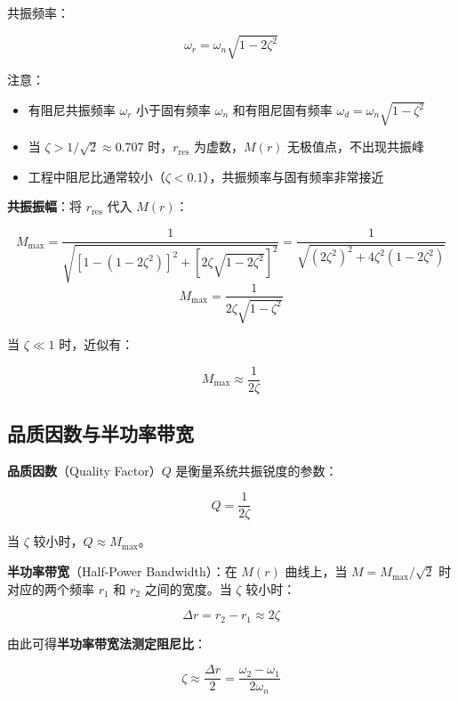 共振频率：
\begin{myformula}
    \[
    \omega_r = \omega_n\sqrt{1-2\zeta^2}
    \]
\end{myformula}

注意：
\begin{itemize}
    \item 有阻尼共振频率 $\omega_r$ 小于固有频率 $\omega_n$ 和有阻尼固有频率 $\omega_d = \omega_n\sqrt{1-\zeta^2}$
    \item 当 $\zeta > 1/\sqrt{2} \approx 0.707$ 时，$r_{\text{res}}$ 为虚数，$M(r)$ 无极值点，不出现共振峰
    \item 工程中阻尼比通常较小（$\zeta < 0.1$），共振频率与固有频率非常接近
\end{itemize}

\textbf{共振振幅}：将 $r_{\text{res}}$ 代入 $M(r)$：
\begin{myformula}
    \[
    M_{\max} = \frac{1}{\sqrt{[1 - (1-2\zeta^2)]^2 + [2\zeta\sqrt{1-2\zeta^2}]^2}}
             = \frac{1}{\sqrt{(2\zeta^2)^2 + 4\zeta^2(1-2\zeta^2)}}
    \]
    \[
    \boxed{M_{\max} = \frac{1}{2\zeta\sqrt{1-\zeta^2}}}
    \]
\end{myformula}

当 $\zeta \ll 1$ 时，近似有：
\begin{myformula}
    \[
    M_{\max} \approx \frac{1}{2\zeta}
    \]
\end{myformula}

\subsection{品质因数与半功率带宽}

\textbf{品质因数}（Quality Factor）$Q$ 是衡量系统共振锐度的参数：
\begin{myformula}
    \[
    Q = \frac{1}{2\zeta}
    \]
\end{myformula}

当 $\zeta$ 较小时，$Q \approx M_{\max}$。

\textbf{半功率带宽}（Half-Power Bandwidth）：在 $M(r)$ 曲线上，当 $M = M_{\max}/\sqrt{2}$ 时对应的两个频率 $r_1$ 和 $r_2$ 之间的宽度。当 $\zeta$ 较小时：
\begin{myformula}
    \[
    \Delta r = r_2 - r_1 \approx 2\zeta
    \]
\end{myformula}

由此可得\textbf{半功率带宽法测定阻尼比}：
\begin{myformula}
    \[
    \zeta \approx \frac{\Delta r}{2} = \frac{\omega_2 - \omega_1}{2\omega_n}
    \]
\end{myformula}

